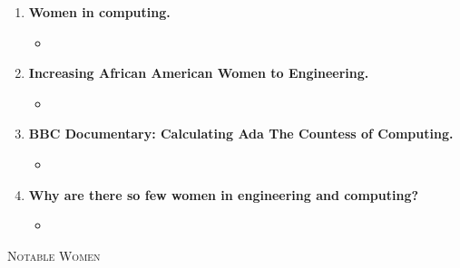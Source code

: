\documentclass[12pt,a4paper]{article}
\begin{document}
\begin{enumerate}
  \begin{itemize}
    \item[] 
  \end{itemize}
  \item \textbf{Women in computing.}
  \begin{itemize}
    \item[] 
  \end{itemize}
  \item \textbf{Increasing African American Women to Engineering.}
  \begin{itemize}
    \item[] 
  \end{itemize}
  \item \textbf{BBC Documentary: Calculating Ada The Countess of Computing.}
  \begin{itemize}
    \item[] 
  \end{itemize}
  \item \textbf{Why are there so few women in engineering and computing?}
  \begin{itemize}
    \item[] 
  \end{itemize}
\end{enumerate}
  

\clearpage
\begin{center}
  \large\textsc{Notable Women}
\end{center}
\end{document}
